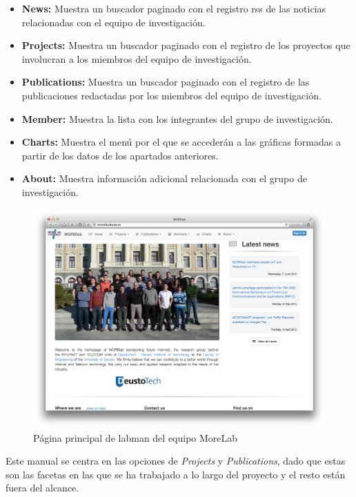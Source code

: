 \begin{itemize}
	\item \textbf{News:} Muestra un buscador paginado con el registro \acrfull{rss} de las noticias relacionadas con el equipo de investigación.
	\item \textbf{Projects:} Muestra un buscador paginado con el registro de los proyectos que involucran a los miembros del equipo de investigación.
	\item \textbf{Publications:} Muestra un buscador paginado con el registro de las publicaciones redactadas por los miembros del equipo de investigación.
	\item \textbf{Member:} Muestra la lista con los integrantes del grupo de investigación.
	\item \textbf{Charts:} Muestra el menú por el que se accederán a las gráficas formadas a partir de los datos de los apartados anteriores.
	\item \textbf{About:} Muestra información adicional relacionada con el grupo de investigación.
\end{itemize}

\begin{figure}[!htbp]
	\centering
	\includegraphics[scale=0.31]{fig/morelab_homepage}
	\caption{Página principal de \acrshort{labman} del equipo MoreLab}
	\label{fig:morelab_homepage}
\end{figure}

Este manual se centra en las opciones de \textit{Projects} y \textit{Publications}, dado que estas son las facetas en las que se ha trabajado a lo largo del proyecto y el resto están fuera del alcance.